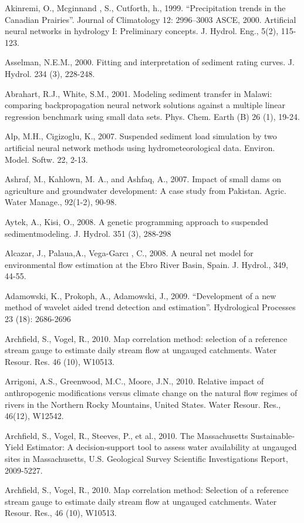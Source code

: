 \begin{hangingpar}{2em}
Akinremi, O., Mcginnand , S., Cutforth, h., 1999. ``Precipitation trends in the Canadian Prairies''. Journal of Climatology 12: 2996–3003
ASCE, 2000. Artificial neural networks in hydrology I: Preliminary concepts. J. Hydrol. Eng., 5(2), 115-123.

Asselman, N.E.M., 2000. Fitting and interpretation of sediment rating curves. J. Hydrol. 234 (3), 228-248.

Abrahart, R.J., White, S.M., 2001. Modeling sediment transfer in Malawi: comparing backpropagation neural network solutions against a multiple linear regression benchmark using small data sets. Phys. Chem. Earth (B) 26 (1), 19-24.

Alp, M.H., Cigizoglu, K., 2007. Suspended sediment load simulation by two artificial neural network methods using hydrometeorological data. Environ. Model. Softw. 22, 2-13.

Ashraf, M., Kahlown, M. A., and Ashfaq, A., 2007. Impact of small dams on agriculture and groundwater development: A case study from Pakistan.  Agric. Water Manage., 92(1-2), 90-98.

Aytek, A., Kisi, O., 2008. A genetic programming approach to suspended sedimentmodeling. J. Hydrol. 351 (3), 288-298

Alcazar, J., Palaua,A., Vega-Garcı , C., 2008.  A neural net model for environmental ﬂow estimation at the Ebro River Basin, Spain.  J. Hydrol., 349, 44-55.

Adamowski, K., Prokoph, A., Adamowski, J., 2009. ``Development of a new method of wavelet aided trend detection and estimation''. Hydrological Processes 23 (18): 2686-2696

Archfield, S., Vogel, R., 2010. Map correlation method: selection of a reference stream gauge to estimate daily stream flow at ungauged catchments. Water Resour. Res. 46 (10), W10513.

Arrigoni, A.S., Greenwood, M.C., Moore, J.N., 2010. Relative impact of anthropogenic modifications versus climate change on the natural flow regimes of rivers in the Northern Rocky Mountains, United States. Water Resour. Res., 46(12), W12542.

Archfield, S., Vogel, R., Steeves, P., et al., 2010. The Massachusetts Sustainable‐Yield Estimator: A decision‐support tool to assess water availability at ungauged sites in Massachusetts, U.S. Geological Survey Scientific Investigations Report, 2009-5227.

Archfield, S., Vogel, R., 2010. Map correlation method: Selection of a reference stream gauge to estimate daily stream flow at ungauged catchments. Water Resour. Res., 46 (10), W10513.


\end{hangingpar}

